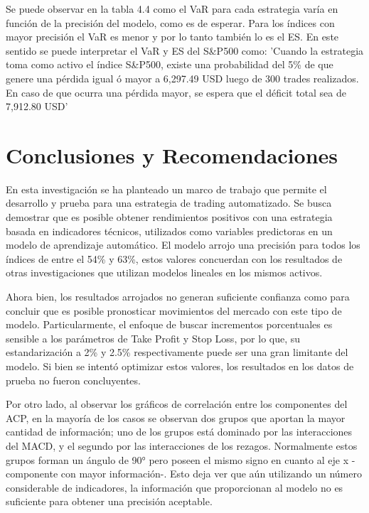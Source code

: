 \documentclass[a4paper,12pt]{Latex/Classes/PhDthesisPSnPDF}
\begin{document}
Se puede observar en la tabla 4.4 como el VaR para cada estrategia varía en función de la precisión del modelo, como es de esperar. Para los índices con mayor precisión el VaR es menor y por lo tanto también lo es el ES. En este sentido se puede interpretar el VaR y ES del S\&P500 como: 'Cuando la estrategia toma como activo el índice S\&P500, existe una probabilidad del 5\% de que genere una pérdida igual ó mayor a 6,297.49 USD luego de 300 trades realizados. En caso de que ocurra una pérdida mayor, se espera que el déficit total sea de 7,912.80 USD'

\chapter*{Conclusiones y Recomendaciones}

En esta investigación se ha planteado un marco de trabajo que permite el desarrollo y prueba para una estrategia de trading automatizado. Se busca demostrar que es posible obtener rendimientos positivos con una estrategia basada en indicadores técnicos, utilizados como variables predictoras en un modelo de aprendizaje automático. El modelo arrojo una precisión para todos los índices de entre el 54\% y 63\%, estos valores concuerdan con los resultados de otras investigaciones que utilizan modelos lineales en los mismos activos. 

Ahora bien, los resultados arrojados no generan suficiente confianza como para concluir que es posible pronosticar movimientos del mercado con este tipo de modelo. Particularmente, el enfoque de buscar incrementos porcentuales es sensible a los parámetros de Take Profit y Stop Loss, por lo que, su estandarización a 2\% y 2.5\% respectivamente puede ser una gran limitante del modelo. Si bien se intentó optimizar estos valores, los resultados en los datos de prueba no fueron concluyentes.

Por otro lado, al observar los gráficos de correlación entre los componentes del ACP, en la mayoría de los casos se observan dos grupos que aportan la mayor cantidad de información; uno de los grupos está dominado por las interacciones del MACD, y el segundo por las interacciones de los rezagos. Normalmente estos grupos forman un ángulo de 90° pero poseen el mismo signo en cuanto al eje x -componente con mayor información-. Esto deja ver que aún utilizando un número considerable de indicadores, la información que proporcionan al modelo no es suficiente para obtener una precisión aceptable. 
\end{document}
